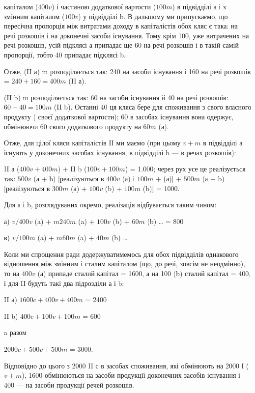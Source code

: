 \parcont{}  %
капіталом ($400 v$) і частиною додаткової вартости ($100 m$) в підвідділі а
і з змінним капіталом ($100 v$) у підвідділі b. В дальшому ми припускаємо,
що пересічна пропорція між витратами доходу в капіталістів обох кляс
є така:  на речі розкошів і  на доконечні засоби існування.
Тому крім 100, уже витрачених на речі розкошів, усій підклясі а припадає
ще 60 на речі розкошів і в такій самій пропорції, тобто 40 припадає
підклясі b.

Отже, (II а) m розподіляється так: 240 на засоби існування і 160 на
речі розкошів = $240 + 160 = 400 m$ (II а).

(II b) m розподіляється так: 60 на засоби існування й 40 на речі
розкошів: $60 + 40 = 100 m$ (II b). Останні 40 ця кляса бере для споживання
з свого власного продукту ( своєї додаткової вартости); 60 в
засобах існування вона одержує, обмінюючи 60 свого додаткового продукту
на $60 m$ (а).

Отже, для цілої кляси капіталістів II ми маємо (при цьому $v + m$ в
підвідділі а існують у доконечних засобах існування, в підвідділі b — в
речах розкошів):

II а ($400 v + 400 m$) + II b ($100 v + 100 m$) = 1.000; через рух усе
це реалізується так: $500 v$ (а + b) [реалізуються в $400 v$ (а) і $100 m$ + (а)] +
$500m$ (а + b) [реалізуються в $300 m$ (а) + $100 v$ (b) + $100 m$ (b)] =
1000.

Для а і b, розглядуваних окремо, реалізація відбувається таким
чином:

а) $v / 400 v$ (a) + $m 240 m$ (a) + $100 v$ (b) + $60 m$ (b) \dots{} = 800

в) $v / 100 m$ (a) + $m 60 m$ (a) + $40 m$ (b) \dots{} = 

Коли ми спрощення ради додержуватимемось для обох підвідділів однакового
відношення між змінним і сталим капіталом (що, до речі, зовсім не неодмінно),
то на $400 v$ (а) припаде сталий капітал = 1600, а на 100 (b)
сталий капітал = 400, і для II будуть такі два підрозділи а і b:

II а) $1600 c + 400 v + 400 m$ = 2400

II b) $400 c + 100 v + 100 m$ = 600

a разом

$2000 c + 500 v + 500 m$ = 3000.

Відповідно до цього з 2000 II с в засобах споживання, які обмінюють
на 2000 І ($v + m$), 1600 обмінюються на засоби продукції доконечних
засобів існування і 400 — на засоби продукції речей розкошів.

